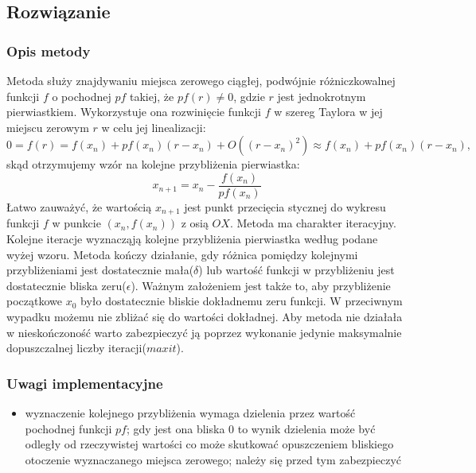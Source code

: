 \documentclass{article}
\begin{document}
\subsection{Rozwiązanie}
\subsubsection{Opis metody}
Metoda służy znajdywaniu miejsca zerowego ciągłej, podwójnie różniczkowalnej funkcji $f$ o pochodnej $pf$
takiej, że $pf(r) \ne 0$, gdzie $r$ jest jednokrotnym pierwiastkiem. Wykorzystuje ona rozwinięcie funkcji $f$ w szereg Taylora 
w jej miejscu zerowym $r$ w celu jej linealizacji:
\[ 0 = f(r) = f(x_n) + pf(x_n)(r - x_n) + O((r-x_n)^2) \approx f(x_n) + pf(x_n)(r - x_n), \] 
skąd otrzymujemy wzór na kolejne przybliżenia pierwiastka:
\[ x_{n+1} = x_n - \frac{f(x_n)}{pf(x_n)} \]
Łatwo zauważyć, że wartością $x_{n+1}$ jest punkt przecięcia stycznej do wykresu funkcji $f$ w punkcie $(x_n, f(x_n))$ z osią $OX$.
Metoda ma charakter iteracyjny. Kolejne iteracje wyznacząją kolejne przybliżenia pierwiastka według podane wyżej wzoru.
Metoda kończy działanie, gdy różnica pomiędzy kolejnymi przybliżeniami jest dostatecznie mała($\delta$) lub wartość funkcji w przybliżeniu jest dostatecznie bliska zeru($\epsilon$). 
Ważnym założeniem jest także to, aby przybliżenie początkowe $x_0$ było dostatecznie bliskie dokładnemu zeru funkcji. W przeciwnym wypadku możemu nie zbliżać się do wartości dokładnej.
Aby metoda nie działała w nieskończoność warto zabezpieczyć ją poprzez wykonanie jedynie maksymalnie dopuszczalnej liczby iteracji($maxit$).

\subsubsection{Uwagi implementacyjne}
\begin{itemize}
    \item wyznaczenie kolejnego przybliżenia wymaga dzielenia przez wartość pochodnej funkcji $pf$; gdy jest ona bliska $0$ to wynik dzielenia może być odległy od rzeczywistej wartości 
    co może skutkować opuszczeniem bliskiego otoczenie wyznaczanego miejsca zerowego; należy się przed tym zabezpieczyć
\end{itemize}
\end{document}
